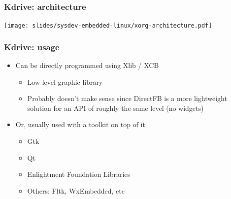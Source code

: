 \begin{frame}
  \frametitle{Kdrive: architecture}
  \begin{center}
    \texttt{[image: slides/sysdev-embedded-linux/xorg-architecture.pdf]}
  \end{center}
\end{frame}

\begin{frame}
  \frametitle{Kdrive: usage}
  \begin{itemize}
  \item Can be directly programmed using Xlib / XCB
    \begin{itemize}
    \item Low-level graphic library
    \item Probably doesn't make sense since DirectFB is a more
      lightweight solution for an API of roughly the same level (no
      widgets)
    \end{itemize}
  \item Or, usually used with a toolkit on top of it
    \begin{itemize}
    \item Gtk
    \item Qt
    \item Enlightment Foundation Libraries
    \item Others: Fltk, WxEmbedded, etc
    \end{itemize}
  \end{itemize}
\end{frame}

